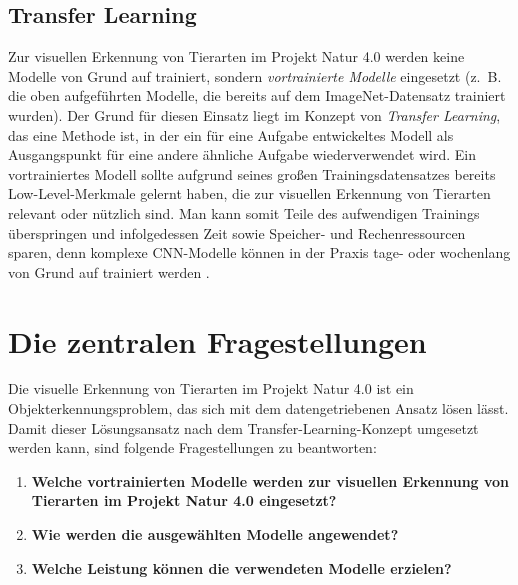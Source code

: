 \subsection{Transfer Learning}

Zur visuellen Erkennung von Tierarten im Projekt Natur 4.0 werden keine Modelle von Grund auf trainiert, sondern \emph{vortrainierte Modelle} eingesetzt (z.~B. die oben aufgeführten Modelle, die bereits auf dem ImageNet-Datensatz trainiert wurden). Der Grund für diesen Einsatz liegt im Konzept von \emph{Transfer Learning}, das eine Methode ist, in der ein für eine Aufgabe entwickeltes Modell als Ausgangspunkt für eine andere ähnliche Aufgabe wiederverwendet wird. Ein vortrainiertes Modell sollte aufgrund seines großen Trainingsdatensatzes bereits Low-Level-Merkmale gelernt haben, die zur visuellen Erkennung von Tierarten relevant oder nützlich sind. Man kann somit Teile des aufwendigen Trainings überspringen und infolgedessen Zeit sowie Speicher- und Rechenressourcen sparen, denn komplexe CNN-Modelle können in der Praxis tage- oder wochenlang von Grund auf trainiert werden \cite[4]{Schroff_2015}\cite[1]{codreanu2017scale}\cite{BBVADeepLearning,StanfordDAWNBench}.



\section{Die zentralen Fragestellungen}

Die visuelle Erkennung von Tierarten im Projekt Natur 4.0 ist ein Objekterkennungsproblem, das sich mit dem datengetriebenen Ansatz lösen lässt. Damit dieser Lösungsansatz nach dem Transfer-Learning-Konzept umgesetzt werden kann, sind folgende Fragestellungen zu beantworten:

\begin{enumerate}
	\item \textbf{Welche vortrainierten Modelle werden zur visuellen Erkennung von Tierarten im Projekt Natur 4.0 eingesetzt?}
	
	\item \textbf{Wie werden die ausgewählten Modelle angewendet?}
	
	\item \textbf{Welche Leistung können die verwendeten Modelle erzielen?}
\end{enumerate}

